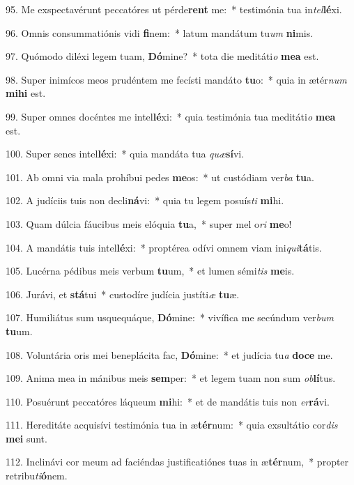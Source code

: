 95. Me exspectavérunt peccatóres ut pérde\textbf{rent} me:~*  testimónia tua in\textit{tel}\textbf{lé}xi.\

96. Omnis consummatiónis vidi \textbf{fi}nem:~*  latum mandátum tu\textit{um} \textbf{ni}mis.\

97. Quómodo diléxi legem tuam, \textbf{Dó}mine?~*  tota die meditáti\textit{o} \textbf{me}\textbf{a} est.\

98. Super inimícos meos prudéntem me fecísti mandáto \textbf{tu}o:~*  quia in ætér\textit{num} \textbf{mi}\textbf{hi} est.\

99. Super omnes docéntes me intel\textbf{lé}xi:~*  quia testimónia tua meditáti\textit{o} \textbf{me}\textbf{a} est.\

100. Super senes intel\textbf{lé}xi:~*  quia mandáta tua \textit{quæ}\textbf{sí}vi.\

101. Ab omni via mala prohíbui pedes \textbf{me}os:~*  ut custódiam ver\textit{ba} \textbf{tu}a.\

102. A judíciis tuis non decli\textbf{ná}vi:~*  quia tu legem posuís\textit{ti} \textbf{mi}hi.\

103. Quam dúlcia fáucibus meis elóquia \textbf{tu}a,~*  super mel o\textit{ri} \textbf{me}o!\

104. A mandátis tuis intel\textbf{lé}xi:~*  proptérea odívi omnem viam ini\textit{qui}\textbf{tá}tis.\

105. Lucérna pédibus meis verbum \textbf{tu}um,~*  et lumen sémi\textit{tis} \textbf{me}is.\

106. Jurávi, et \textbf{stá}tui~*  custodíre judícia justíti\textit{æ} \textbf{tu}æ.\

107. Humiliátus sum usquequáque, \textbf{Dó}mine:~*  vivífica me secúndum ver\textit{bum} \textbf{tu}um.\

108. Voluntária oris mei beneplácita fac, \textbf{Dó}mine:~*  et judícia tu\textit{a} \textbf{do}\textbf{ce} me.\

109. Anima mea in mánibus meis \textbf{sem}per:~*  et legem tuam non sum \textit{ob}\textbf{lí}tus.\

110. Posuérunt peccatóres láqueum \textbf{mi}hi:~*  et de mandátis tuis non \textit{er}\textbf{rá}vi.\

111. Hereditáte acquisívi testimónia tua in æ\textbf{tér}num:~*  quia exsultátio cor\textit{dis} \textbf{me}\textbf{i} sunt.\

112. Inclinávi cor meum ad faciéndas justificatiónes tuas in æ\textbf{tér}num,~*  propter retribu\textit{ti}\textbf{ó}nem.\

